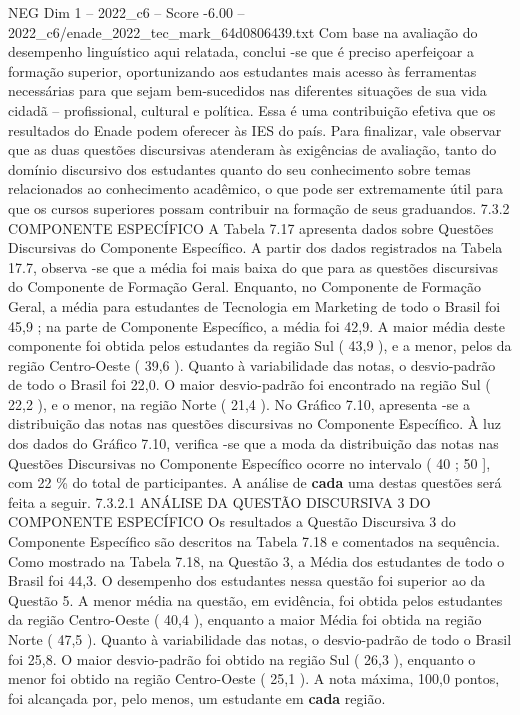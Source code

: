 \begin{textsample}{NEG Dim 1 – 2022\_c6 – Score -6.00 – 2022\_c6/enade\_2022\_tec\_mark\_64d0806439.txt}
Com base na avaliação do desempenho linguístico aqui relatada, conclui -se que é preciso aperfeiçoar a formação superior, oportunizando aos estudantes mais acesso às ferramentas necessárias para que sejam bem-sucedidos nas diferentes situações de sua vida cidadã – profissional, cultural e política.
Essa é uma contribuição efetiva que os resultados do Enade podem oferecer às IES do país.
Para finalizar, vale observar que as duas questões discursivas atenderam às exigências de avaliação, tanto do domínio discursivo dos estudantes quanto do seu conhecimento sobre temas relacionados ao conhecimento acadêmico, o que pode ser extremamente útil para que os cursos superiores possam contribuir na formação de seus graduandos. 7.3.2 COMPONENTE ESPECÍFICO A Tabela 7.17 apresenta dados sobre Questões Discursivas do Componente Específico.
A partir dos dados registrados na Tabela 17.7, observa -se que a média foi mais baixa do que para as questões discursivas do Componente de Formação Geral.
Enquanto, no Componente de Formação Geral, a média para estudantes de Tecnologia em Marketing de todo o Brasil foi 45,9 ; na parte de Componente Específico, a média foi 42,9.
A maior média deste componente foi obtida pelos estudantes da região Sul ( 43,9 ), e a menor, pelos da região Centro-Oeste ( 39,6 ).
Quanto à variabilidade das notas, o desvio-padrão de todo o Brasil foi 22,0.
O maior desvio-padrão foi encontrado na região Sul ( 22,2 ), e o menor, na região Norte ( 21,4 ).
No Gráfico 7.10, apresenta -se a distribuição das notas nas questões discursivas no Componente Específico.
À luz dos dados do Gráfico 7.10, verifica -se que a moda da distribuição das notas nas Questões Discursivas no Componente Específico ocorre no intervalo ( 40 ; 50 ], com 22 \% do total de participantes.
A análise de \textbf{cada} uma destas questões será feita a seguir. 7.3.2.1 ANÁLISE DA QUESTÃO DISCURSIVA 3 DO COMPONENTE ESPECÍFICO Os resultados a Questão Discursiva 3 do Componente Específico são descritos na Tabela 7.18 e comentados na sequência.
Como mostrado na Tabela 7.18, na Questão 3, a Média dos estudantes de todo o Brasil foi 44,3.
O desempenho dos estudantes nessa questão foi superior ao da Questão 5.
A menor média na questão, em evidência, foi obtida pelos estudantes da região Centro-Oeste ( 40,4 ), enquanto a maior Média foi obtida na região Norte ( 47,5 ).
Quanto à variabilidade das notas, o desvio-padrão de todo o Brasil foi 25,8.
O maior desvio-padrão foi obtido na região Sul ( 26,3 ), enquanto o menor foi obtido na região Centro-Oeste ( 25,1 ).
A nota máxima, 100,0 pontos, foi alcançada por, pelo menos, um estudante em \textbf{cada} região.

\end{textsample}
